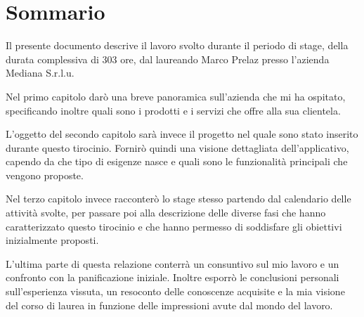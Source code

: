 
\cleardoublepage
{}
{}
\begingroup
\let\clearpage\relax
\let\cleardoublepage\relax
\let\cleardoublepage\relax

\chapter*{Sommario}
Il presente documento descrive il lavoro svolto durante il periodo di stage, della durata complessiva di 303 ore, dal laureando Marco Prelaz presso l'azienda Mediana S.r.l.u.   

Nel primo capitolo darò una breve panoramica sull'azienda che mi ha ospitato, specificando inoltre quali sono i prodotti e i servizi che offre alla sua clientela.

L'oggetto del secondo capitolo sarà invece il progetto nel quale sono stato inserito durante questo tirocinio. Fornirò quindi una visione dettagliata dell'applicativo, capendo da che tipo di esigenze nasce e quali sono le funzionalità principali che vengono proposte.
 
Nel terzo capitolo invece racconterò lo stage stesso partendo dal calendario delle attività svolte, per passare poi alla descrizione delle diverse fasi che hanno caratterizzato questo tirocinio e che hanno permesso di soddisfare gli obiettivi inizialmente proposti.

L'ultima parte di questa relazione conterrà un consuntivo sul mio lavoro e un confronto con la panificazione iniziale. Inoltre esporrò le conclusioni personali sull'esperienza vissuta, un resoconto delle conoscenze acquisite e la mia visione del corso di laurea in funzione delle impressioni avute dal mondo del lavoro.

%
%

\endgroup			

\vfill


